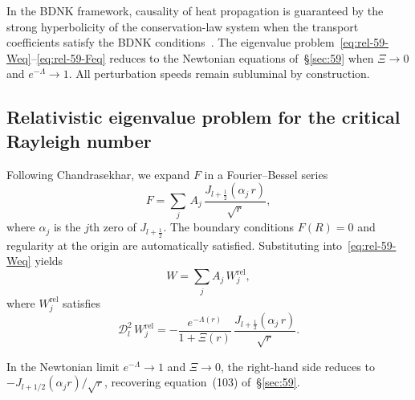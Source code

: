 \begin{causalitycheck}
In the BDNK framework, causality of heat propagation is guaranteed by
the strong hyperbolicity of the conservation-law system when the
transport coefficients satisfy the BDNK
conditions~\cite{BemficaDN2018,Kovtun2019,BemficaDNK2023}.
The eigenvalue problem~\eqref{eq:rel-59-Weq}--\eqref{eq:rel-59-Feq}
reduces to the Newtonian equations of~\S\ref{sec:59} when
$\Xi\to 0$ and $e^{-\Lambda}\to 1$.
All perturbation speeds remain subluminal by construction.
\end{causalitycheck}

\subsection{Relativistic eigenvalue problem for the critical
Rayleigh number}
\label{sec:rel-59-eigen}

Following Chandrasekhar, we expand $F$ in a Fourier--Bessel series
\begin{equation}
\label{eq:rel-59-FBexp}
F = \sum_{j}\,A_{j}\,
  \frac{J_{l+\frac{1}{2}}(\alpha_{j}\,r)}{\sqrt{r}},
\end{equation}
where $\alpha_{j}$ is the $j$th zero of $J_{l+\frac{1}{2}}$.  The
boundary conditions $F(R)=0$ and regularity at the origin are
automatically satisfied.  Substituting into~\eqref{eq:rel-59-Weq}
yields
\begin{equation}
\label{eq:rel-59-Wj}
W = \sum_{j} A_{j}\,W_{j}^{\mathrm{rel}},
\end{equation}
where $W_{j}^{\mathrm{rel}}$ satisfies
\begin{equation}
\label{eq:rel-59-Wjeq}
\mathscr{D}_{l}^{2}\,W_{j}^{\mathrm{rel}}
  = -\frac{e^{-\Lambda(r)}}{1+\Xi(r)}\,
    \frac{J_{l+\frac{1}{2}}(\alpha_{j}\,r)}{\sqrt{r}}.
\end{equation}

In the Newtonian limit $e^{-\Lambda}\to 1$ and $\Xi\to 0$, the
right-hand side reduces to
$-J_{l+1/2}(\alpha_{j}r)/\sqrt{r}$,
recovering equation~(103) of~\S\ref{sec:59}.

